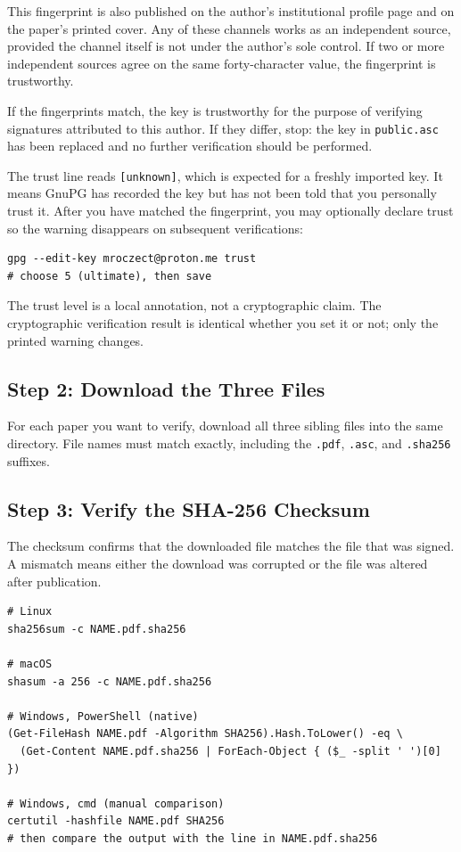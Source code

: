 This fingerprint is also published on the author's institutional
profile page and on the paper's printed cover. Any of these
channels works as an independent source, provided the channel
itself is not under the author's sole control. If two or more
independent sources agree on the same forty-character value, the
fingerprint is trustworthy.

If the fingerprints match, the key is trustworthy for the purpose
of verifying signatures attributed to this author. If they differ,
stop: the key in \texttt{public.asc} has been replaced and no
further verification should be performed.

The trust line reads \texttt{[unknown]}, which is expected for a
freshly imported key. It means GnuPG has recorded the key but has
not been told that you personally trust it. After you have matched
the fingerprint, you may optionally declare trust so the warning
disappears on subsequent verifications:

\begin{lstlisting}[style=code]
gpg --edit-key mroczect@proton.me trust
# choose 5 (ultimate), then save
\end{lstlisting}

The trust level is a local annotation, not a cryptographic claim.
The cryptographic verification result is identical whether you set
it or not; only the printed warning changes.

\subsection*{Step 2: Download the Three Files}

For each paper you want to verify, download all three sibling files
into the same directory. File names must match exactly, including
the \texttt{.pdf}, \texttt{.asc}, and \texttt{.sha256} suffixes.

\subsection*{Step 3: Verify the SHA-256 Checksum}

The checksum confirms that the downloaded file matches the file
that was signed. A mismatch means either the download was corrupted
or the file was altered after publication.

\begin{lstlisting}[style=code]
# Linux
sha256sum -c NAME.pdf.sha256

# macOS
shasum -a 256 -c NAME.pdf.sha256

# Windows, PowerShell (native)
(Get-FileHash NAME.pdf -Algorithm SHA256).Hash.ToLower() -eq \
  (Get-Content NAME.pdf.sha256 | ForEach-Object { ($_ -split ' ')[0] })

# Windows, cmd (manual comparison)
certutil -hashfile NAME.pdf SHA256
# then compare the output with the line in NAME.pdf.sha256
\end{lstlisting}

